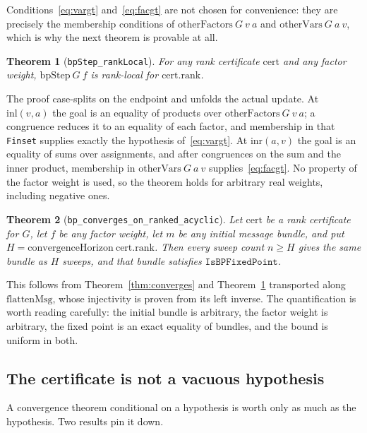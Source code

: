 \documentclass[aps,prx,reprint,nofootinbib,floatfix]{revtex4-2}
\newtheorem{thm}{Theorem}
\begin{document}
Conditions~\eqref{eq:vargt} and~\eqref{eq:facgt} are not chosen for
convenience: they are precisely the membership conditions of
$\mathrm{otherFactors}\ G\ v\ a$ and $\mathrm{otherVars}\ G\ a\ v$, which is
why the next theorem is provable at all.

\begin{thm}[\texttt{bpStep\_rankLocal}]
\label{thm:ranklocal}
For any rank certificate $\mathrm{cert}$ and any factor weight,
$\mathrm{bpStep}\ G\ f$ is rank-local for $\mathrm{cert.rank}$.
\end{thm}

The proof case-splits on the endpoint and unfolds the actual update. At
$\mathrm{inl}(v,a)$ the goal is an equality of products over
$\mathrm{otherFactors}\ G\ v\ a$; a congruence reduces it to an equality of
each factor, and membership in that \texttt{Finset} supplies exactly the
hypothesis of~\eqref{eq:vargt}. At $\mathrm{inr}(a,v)$ the goal is an equality
of sums over assignments, and after congruences on the sum and the inner
product, membership in $\mathrm{otherVars}\ G\ a\ v$ supplies~\eqref{eq:facgt}.
No property of the factor weight is used, so the theorem holds for arbitrary
real weights, including negative ones.

\begin{thm}[\texttt{bp\_converges\_on\_ranked\_acyclic}]
\label{thm:bpconv}
Let $\mathrm{cert}$ be a rank certificate for $G$, let $f$ be any factor weight,
let $m$ be any initial message bundle, and put
$H = \mathrm{convergenceHorizon}\ \mathrm{cert.rank}$. Then every sweep count
$n \geq H$ gives the same bundle as $H$ sweeps, and that bundle satisfies
$\texttt{IsBPFixedPoint}$.
\end{thm}

This follows from Theorem~\ref{thm:converges} and
Theorem~\ref{thm:ranklocal} transported along $\mathrm{flattenMsg}$, whose
injectivity is proven from its left inverse. The quantification is worth
reading carefully: the initial bundle is arbitrary, the factor weight is
arbitrary, the fixed point is an exact equality of bundles, and the bound is
uniform in both.

\subsection{The certificate is not a vacuous hypothesis}

A convergence theorem conditional on a hypothesis is worth only as much as the
hypothesis. Two results pin it down.
\end{document}
